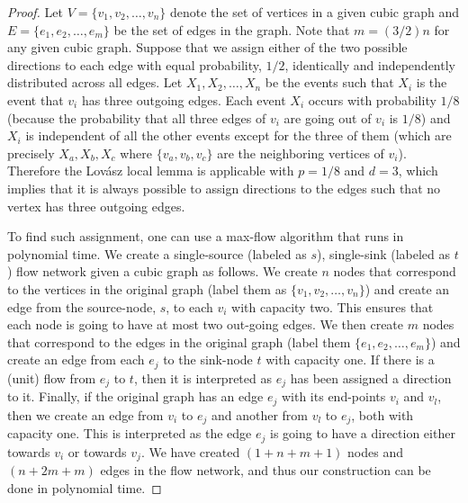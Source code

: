 \begin{proof}
		Let $V = \{v_1, v_2, \dots, v_n\}$ denote the set of vertices in a given cubic graph and $E = \{e_1, e_2, \dots, e_m\}$ be the set of edges in the graph. Note that $m = (3/2)n$ for any given cubic graph. Suppose that we assign either of the two possible directions to each edge with equal probability, $1/2$, identically and independently distributed across all edges. 
		Let $X_1, X_2, \dots, X_n$ be the events such that $X_i$ is the event that $v_i$ has three outgoing edges.
		Each event $X_i$ occurs with probability $1/8$ (because the probability that all three edges of $v_i$ are going out of $v_i$ is $1/8$) and $X_i$ is independent of all the other events except for the three of them (which are precisely $X_a, X_b, X_c$ where $\{v_a,v_b,v_c\}$ are the neighboring vertices of $v_i$). Therefore the Lov{\'a}sz local lemma is applicable with $p = 1/8$ and $d = 3$, which implies that it is always possible to assign directions to the edges such that no vertex has three outgoing edges. 

		To find such assignment, one can use a max-flow algorithm that runs in polynomial time. We create a single-source (labeled as $s$), single-sink (labeled as $t$) flow network given a cubic graph as follows. We create $n$ nodes that correspond to the vertices in the original graph (label them as $\{v_1, v_2, \dots, v_n\}$) and create an edge from the source-node, $s$, to each $v_i$ with capacity two. This ensures that each node is going to have at most two out-going edges.
		We then create $m$ nodes that correspond to the edges in the original graph (label them $\{e_1, e_2, \dots, e_m\}$) and create an edge from each $e_j$ to the sink-node $t$ with capacity one. If there is a (unit) flow from $e_j$ to $t$, then it is interpreted as $e_j$ has been assigned a direction to it.  
	Finally, if the original graph has an edge $e_j$ with its end-points $v_i$ and $v_l$, then we create an edge from $v_i$ to $e_j$ and another from $v_l$ to $e_j$, both with capacity one. This is interpreted as the edge $e_j$ is going to have a direction either towards $v_i$ or towards $v_j$. 
	We have created $(1 + n + m + 1)$ nodes and $(n + 2m + m)$ edges in the flow network, and thus our construction can be done in polynomial time.  


\end{proof}
